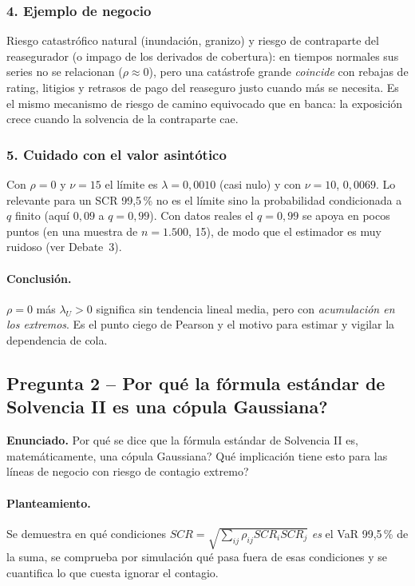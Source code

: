 \documentclass[a4paper,12pt]{article}
\begin{document}
\subsubsection*{4. Ejemplo de negocio}
Riesgo catastrófico natural (inundación, granizo) y riesgo de contraparte del reasegurador (o impago de los derivados de cobertura): en tiempos normales sus series no se relacionan ($\rho\approx0$), pero una catástrofe grande \emph{coincide} con rebajas de rating, litigios y retrasos de pago del reaseguro justo cuando más se necesita. Es el mismo mecanismo de \guillemotleft{}riesgo de camino equivocado\guillemotright{} que en banca: la exposición crece cuando la solvencia de la contraparte cae.

\subsubsection*{5. Cuidado con el valor asintótico}
Con $\rho=0$ y $\nu=15$ el límite es $\lambda=0{,}0010$ (casi nulo) y con $\nu=10$, $0{,}0069$. Lo relevante para un SCR 99,5\,\% no es el límite sino la probabilidad condicionada a $q$ finito (aquí $0{,}09$ a $q=0{,}99$). Con datos reales el $q=0{,}99$ se apoya en pocos puntos (en una muestra de $n=1.500$, 15), de modo que el estimador es muy ruidoso (ver Debate~3).

\paragraph{Conclusión.} $\rho=0$ más $\lambda_U>0$ significa \guillemotleft{}sin tendencia lineal media, pero con \emph{acumulación en los extremos}\guillemotright{}. Es el punto ciego de Pearson y el motivo para estimar y vigilar la dependencia de cola.

\subsection{Pregunta 2 -- \textquestiondown{}Por qué la fórmula estándar de Solvencia II es una cópula Gaussiana?}

\noindent\textbf{Enunciado.} \textquestiondown{}Por qué se dice que la fórmula estándar de Solvencia II es, matemáticamente, una cópula Gaussiana? \textquestiondown{}Qué implicación tiene esto para las líneas de negocio con riesgo de contagio extremo?

\paragraph{Planteamiento.} Se demuestra en qué condiciones $SCR=\sqrt{\sum_{ij}\rho_{ij}SCR_iSCR_j}$ \emph{es} el VaR 99,5\,\% de la suma, se comprueba por simulación qué pasa fuera de esas condiciones y se cuantifica lo que cuesta ignorar el contagio.
\end{document}
